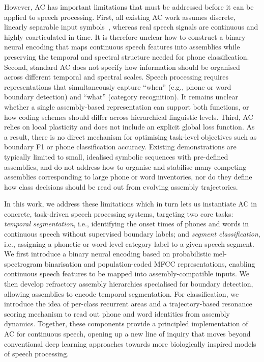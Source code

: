 However, AC has important limitations that must be addressed before it can be applied to speech processing. First, all existing AC work assumes discrete, linearly separable input symbols~\cite{papadimitriouBrainComputationAssemblies2020}, whereas real speech signals are continuous and highly coarticulated in time. It is therefore unclear how to construct a binary neural encoding that maps continuous speech features into assemblies while preserving the temporal and spectral structure needed for phone classification. Second, standard AC does not specify how information should be organised across different temporal and spectral scales. Speech processing requires representations that simultaneously capture ``when'' (e.g., phone or word boundary detection) and ``what'' (category recognition). It remains unclear whether a single assembly-based representation can support both functions, or how coding schemes should differ across hierarchical linguistic levels. Third, AC relies on local plasticity and does not include an explicit global loss function. As a result, there is no direct mechanism for optimising task-level objectives such as boundary F1 or phone classification accuracy. Existing demonstrations are typically limited to small, idealised symbolic sequences with pre-defined assemblies, and do not address how to organise and stabilise many competing assemblies corresponding to large phone or word inventories, nor do they define how class decisions should be read out from evolving assembly trajectories.

In this work, we address these limitations which in turn lets us instantiate AC in concrete, task-driven speech processing systems, targeting two core tasks: \textit{temporal segmentation}, i.e., identifying the onset times of phones and words in continuous speech without supervised boundary labels; and \textit{segment classification}, i.e., assigning a phonetic or word-level category label to a given speech segment. We first introduce a binary neural encoding based on probabilistic mel-spectrogram binarisation and population-coded MFCC representations, enabling continuous speech features to be mapped into assembly-compatible inputs. We then develop refractory assembly hierarchies specialised for boundary detection, allowing assemblies to encode temporal segmentation. For classification, we introduce the idea of per-class recurrent areas and a trajectory-based resonance scoring mechanism to read out phone and word identities from assembly dynamics.
Together, these components provide a principled implementation of AC for continuous speech, opening up a new line of inquiry that moves beyond conventional deep learning approaches towards more biologically inspired models of speech processing.
